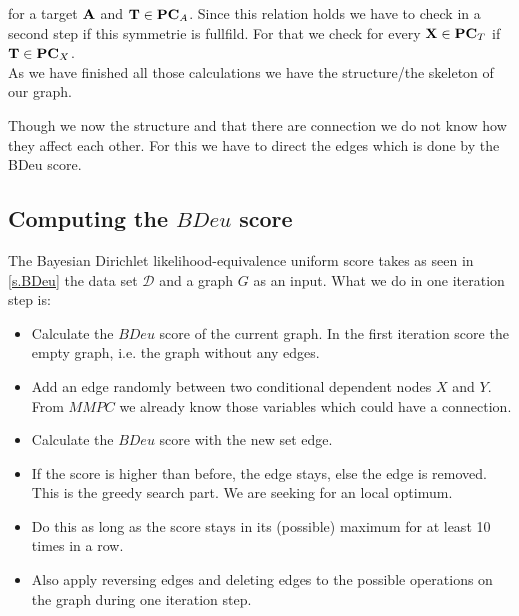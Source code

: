 			for a target ${\textbf{A}}$ and ${\textbf{T}} \in {\textbf{PC}}_{A}$. Since this relation holds we have to check in a second step if this symmetrie is fullfild. For that we check for every ${\textbf{X}} \in {\textbf{PC}}_{T}$ if ${\textbf{T}} \in {\textbf{PC}}_{X}$.\\

			As we have finished all those calculations we have the structure/the skeleton of our graph.
			
			 \label{img.skeleton}

			Though we now the structure and that there are connection we do not know how they affect each other. For this we have to direct the edges which is done by the BDeu score.

		\subsection{Computing the $BDeu$ score}

			The Bayesian Dirichlet likelihood-equivalence uniform score takes as seen in \autoref{s.BDeu} the data set $\mathcal{D}$ and a graph $G$ as an input. What we do in one iteration step is:

			\begin{itemize}
				\item Calculate the $BDeu$ score of the current graph. In the first iteration score the empty graph, i.e. the graph without any edges.
				\item Add an edge randomly between two conditional dependent nodes $X$ and $Y$. From $MMPC$ we already know those variables which could have a connection.
				\item Calculate the $BDeu$ score with the new set edge.
				\item If the score is higher than before, the edge stays, else the edge is removed. This is the greedy search part. We are seeking for an local optimum.
				\item Do this as long as the score stays in its (possible) maximum for at least 10 times in a row.
				\item Also apply reversing edges and deleting edges to the possible operations on the graph during one iteration step.
			\end{itemize}


			 \label{img.empty}


